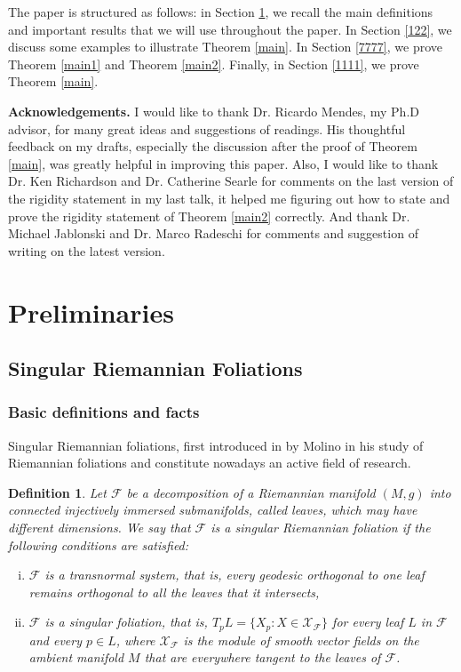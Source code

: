 \documentclass[11pt]{amsart}
\newtheorem{definition}[theorem]{Definition}
\begin{document}
The paper is structured as follows: in Section \ref{121}, we recall the main definitions and important results that we will use throughout the paper. In Section \ref{122}, we discuss some examples to illustrate Theorem \ref{main}. In Section \ref{7777}, we prove Theorem \ref{main1} and Theorem \ref{main2}. Finally, in Section \ref{1111}, we prove Theorem \ref{main}.


\textbf{Acknowledgements.} I would like to thank Dr. Ricardo Mendes, my Ph.D advisor, for many great ideas and suggestions of readings. His thoughtful feedback on my drafts, especially the discussion after the proof of Theorem \ref{main}, was greatly helpful in improving this paper. Also, I would like to thank Dr. Ken Richardson and Dr. Catherine Searle for comments on the last version of the rigidity statement in my last talk, it helped me figuring out how to state and prove the rigidity statement of Theorem \ref{main2} correctly. And thank Dr. Michael Jablonski and Dr. Marco Radeschi for comments and suggestion of writing on the latest version.





\section{Preliminaries}\label{121}
\subsection{Singular Riemannian Foliations}\label{121212}
\subsubsection{Basic definitions and facts}
Singular Riemannian foliations, first introduced in \cite{molino} by Molino in his study of Riemannian foliations and constitute nowadays an active field of research. 
\begin{definition}\label{667}
    Let $\mathcal{F}$ be a decomposition of a Riemannian manifold $(M,g)$ into connected injectively immersed submanifolds, called \textit{leaves}, which may have different dimensions. We say that $\mathcal{F}$ is a \textit{singular Riemannian foliation} if the following conditions are satisfied:
    \begin{enumerate}[(i)]
        \item $\mathcal{F}$ is a \textit{transnormal system}, that is, every geodesic orthogonal to one leaf remains orthogonal to all the leaves that it intersects,
        \item $\mathcal{F}$ is a \textit{singular foliation}, that is, $T_pL=\{X_p:X\in\mathcal{X}_{\mathcal{F}}\}$ for every leaf $L$ in $\mathcal{F}$ and every $p\in L$, where $\mathcal{X}_\mathcal{F}$ is the module of smooth vector fields on the ambient manifold $M$ that are everywhere tangent to the leaves of $\mathcal{F}$.
    \end{enumerate}

   
\end{definition}
\end{document}
